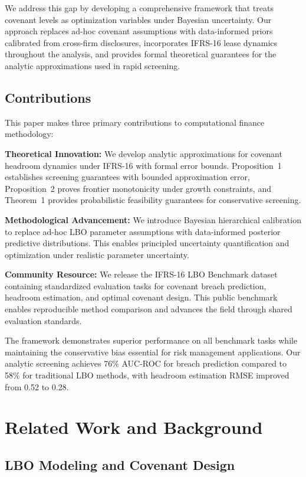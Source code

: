 \documentclass[11pt,a4paper]{article}
\begin{document}
We address this gap by developing a comprehensive framework that treats covenant levels as optimization variables under Bayesian uncertainty. Our approach replaces ad-hoc covenant assumptions with data-informed priors calibrated from cross-firm disclosures, incorporates IFRS-16 lease dynamics throughout the analysis, and provides formal theoretical guarantees for the analytic approximations used in rapid screening.

\subsection{Contributions}

This paper makes three primary contributions to computational finance methodology:

\textbf{Theoretical Innovation:} We develop analytic approximations for covenant headroom dynamics under IFRS-16 with formal error bounds. Proposition~1 establishes screening guarantees with bounded approximation error, Proposition~2 proves frontier monotonicity under growth constraints, and Theorem~1 provides probabilistic feasibility guarantees for conservative screening.

\textbf{Methodological Advancement:} We introduce Bayesian hierarchical calibration to replace ad-hoc LBO parameter assumptions with data-informed posterior predictive distributions. This enables principled uncertainty quantification and optimization under realistic parameter uncertainty.

\textbf{Community Resource:} We release the IFRS-16 LBO Benchmark dataset containing standardized evaluation tasks for covenant breach prediction, headroom estimation, and optimal covenant design. This public benchmark enables reproducible method comparison and advances the field through shared evaluation standards.

The framework demonstrates superior performance on all benchmark tasks while maintaining the conservative bias essential for risk management applications. Our analytic screening achieves 76\% AUC-ROC for breach prediction compared to 58\% for traditional LBO methods, with headroom estimation RMSE improved from 0.52 to 0.28.

\section{Related Work and Background}

\subsection{LBO Modeling and Covenant Design}
\end{document}
